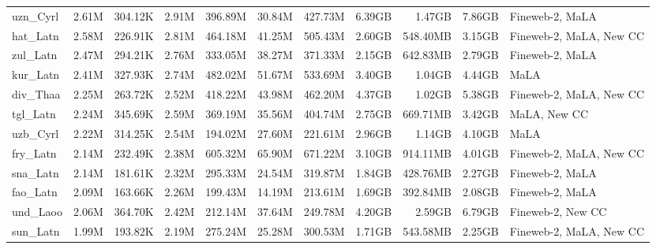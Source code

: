 \begin{table*}[!htp]
{\begin{tabular}{l|rrr|rrr|rrr|l}
uzn\_Cyrl                   & 2.61M      & 304.12K      & 2.91M       & 396.89M      & 30.84M         & 427.73M       & 6.39GB     & 1.47GB       & 7.86GB      & Fineweb-2, MaLA         \\
hat\_Latn                   & 2.58M      & 226.91K      & 2.81M       & 464.18M      & 41.25M         & 505.43M       & 2.60GB     & 548.40MB     & 3.15GB      & Fineweb-2, MaLA, New CC \\
zul\_Latn                   & 2.47M      & 294.21K      & 2.76M       & 333.05M      & 38.27M         & 371.33M       & 2.15GB     & 642.83MB     & 2.79GB      & Fineweb-2, MaLA         \\
kur\_Latn                   & 2.41M      & 327.93K      & 2.74M       & 482.02M      & 51.67M         & 533.69M       & 3.40GB     & 1.04GB       & 4.44GB      & MaLA                    \\
div\_Thaa                   & 2.25M      & 263.72K      & 2.52M       & 418.22M      & 43.98M         & 462.20M       & 4.37GB     & 1.02GB       & 5.38GB      & Fineweb-2, MaLA, New CC \\
tgl\_Latn                   & 2.24M      & 345.69K      & 2.59M       & 369.19M      & 35.56M         & 404.74M       & 2.75GB     & 669.71MB     & 3.42GB      & MaLA, New CC            \\
uzb\_Cyrl                   & 2.22M      & 314.25K      & 2.54M       & 194.02M      & 27.60M         & 221.61M       & 2.96GB     & 1.14GB       & 4.10GB      & MaLA                    \\
fry\_Latn                   & 2.14M      & 232.49K      & 2.38M       & 605.32M      & 65.90M         & 671.22M       & 3.10GB     & 914.11MB     & 4.01GB      & Fineweb-2, MaLA, New CC \\
sna\_Latn                   & 2.14M      & 181.61K      & 2.32M       & 295.33M      & 24.54M         & 319.87M       & 1.84GB     & 428.76MB     & 2.27GB      & Fineweb-2, MaLA         \\
fao\_Latn                   & 2.09M      & 163.66K      & 2.26M       & 199.43M      & 14.19M         & 213.61M       & 1.69GB     & 392.84MB     & 2.08GB      & Fineweb-2, MaLA         \\
und\_Laoo                   & 2.06M      & 364.70K      & 2.42M       & 212.14M      & 37.64M         & 249.78M       & 4.20GB     & 2.59GB       & 6.79GB      & Fineweb-2, New CC       \\
sun\_Latn                   & 1.99M      & 193.82K      & 2.19M       & 275.24M      & 25.28M         & 300.53M       & 1.71GB     & 543.58MB     & 2.25GB      & Fineweb-2, MaLA, New CC \\

\end{tabular}}
\end{table*}
